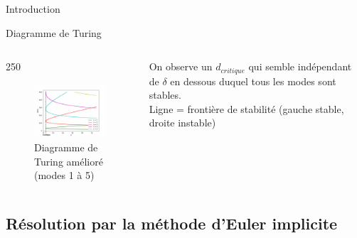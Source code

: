 \documentclass{beamer}
\begin{document}
\begin{frame}{Introduction}
\begin{frame}{Diagramme de Turing}
\begin{columns}
    \begin{column}{250}
    \begin{figure}
    \includegraphics[width=220]{diagrammes_turing_bis_avec_d_crit.png}
    \caption{\label{diagramme_turing_2}{Diagramme de Turing amélioré (modes 1 à 5)}}
    \end{figure}
    \end{column}
    
    \begin{column}{2.7cm}
    On observe un $d_{critique}$ qui semble indépendant de $\delta$ en dessous duquel tous les modes sont stables. \\
    Ligne = frontière de stabilité (gauche stable, droite instable)
    
    \end{column}
    \end{columns}
    
    
\end{frame}




\subsection{Résolution par la méthode d’Euler implicite}


\end{frame}
\end{document}
